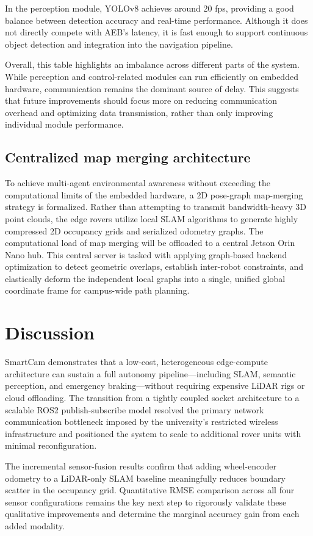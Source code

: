 \documentclass[journal,transmag]{IEEEtran}
\begin{document}
In the perception module, YOLOv8 achieves around 20 fps, providing a good balance between detection accuracy and real-time performance. Although it does not directly compete with AEB's latency, it is fast enough to support continuous object detection and integration into the navigation pipeline.

Overall, this table highlights an imbalance across different parts of the system. While perception and control-related modules can run efficiently on embedded hardware, communication remains the dominant source of delay. This suggests that future improvements should focus more on reducing communication overhead and optimizing data transmission, rather than only improving individual module performance.

\subsection{Centralized map merging architecture}
To achieve multi-agent environmental awareness without exceeding the computational limits of the embedded hardware, a 2D pose-graph map-merging strategy is formalized. Rather than attempting to transmit bandwidth-heavy 3D point clouds, the edge rovers utilize local SLAM algorithms to generate highly compressed 2D occupancy grids and serialized odometry graphs. The computational load of map merging will be offloaded to a central Jetson Orin Nano hub. This central server is tasked with applying graph-based backend optimization to detect geometric overlaps, establish inter-robot constraints, and elastically deform the independent local graphs into a single, unified global coordinate frame for campus-wide path planning.

\section{Discussion}
SmartCam demonstrates that a low-cost, heterogeneous edge-compute architecture can sustain a full autonomy pipeline---including SLAM, semantic perception, and emergency braking---without requiring expensive LiDAR rigs or cloud offloading. The transition from a tightly coupled socket architecture to a scalable ROS2 publish-subscribe model resolved the primary network communication bottleneck imposed by the university's restricted wireless infrastructure and positioned the system to scale to additional rover units with minimal reconfiguration.
 
The incremental sensor-fusion results confirm that adding wheel-encoder odometry to a LiDAR-only SLAM baseline meaningfully reduces boundary scatter in the occupancy grid. Quantitative RMSE comparison across all four sensor configurations remains the key next step to rigorously validate these qualitative improvements and determine the marginal accuracy gain from each added modality.
 
\end{document}
